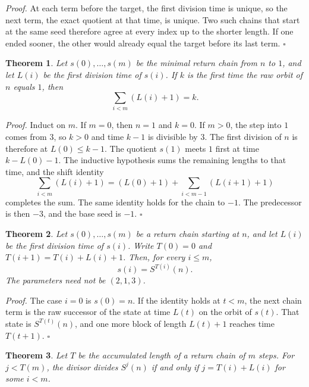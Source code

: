 \documentclass[11pt,letterpaper]{article}
\newtheorem{theorem}{Theorem}
\newenvironment{proof}{\noindent\textit{Proof.}}{\hfill\(\square\)}
\begin{document}
\begin{proof}
At each term before the target, the first division time is unique, so the next term, the exact quotient at that time, is unique. Two such chains that start at the same seed therefore agree at every index up to the shorter length. If one ended sooner, the other would already equal the target before its last term.
\end{proof}

\begin{theorem}
\label{thm:chainlength}
Let \(s(0),\ldots,s(m)\) be the minimal return chain from \(n\) to \(1\), and let \(L(i)\) be the first division time of \(s(i)\). If \(k\) is the first time the raw orbit of \(n\) equals \(1\), then
\[
\sum_{i<m}(L(i)+1)=k.
\]
\end{theorem}

\begin{proof}
Induct on \(m\). If \(m=0\), then \(n=1\) and \(k=0\). If \(m>0\), the step into \(1\) comes from \(3\), so \(k>0\) and time \(k-1\) is divisible by \(3\). The first division of \(n\) is therefore at \(L(0)\le k-1\). The quotient \(s(1)\) meets \(1\) first at time \(k-L(0)-1\). The inductive hypothesis sums the remaining lengths to that time, and the shift identity
\[
\sum_{i<m}(L(i)+1)=(L(0)+1)+\sum_{i<m-1}(L(i+1)+1)
\]
completes the sum. The same identity holds for the chain to \(-1\). The predecessor is then \(-3\), and the base seed is \(-1\).
\end{proof}

\begin{theorem}
\label{thm:chainorbit}
Let \(s(0),\ldots,s(m)\) be a return chain starting at \(n\), and let \(L(i)\) be the first division time of \(s(i)\). Write \(T(0)=0\) and \(T(i+1)=T(i)+L(i)+1\). Then, for every \(i\le m\),
\[
s(i)=S^{T(i)}(n).
\]
The parameters need not be \((2,1,3)\).
\end{theorem}

\begin{proof}
The case \(i=0\) is \(s(0)=n\). If the identity holds at \(t<m\), the next chain term is the raw successor of the state at time \(L(t)\) on the orbit of \(s(t)\). That state is \(S^{T(t)}(n)\), and one more block of length \(L(t)+1\) reaches time \(T(t+1)\).
\end{proof}

\begin{theorem}
\label{thm:divisiontimes}
Let \(T\) be the accumulated length of a return chain of \(m\) steps. For \(j<T(m)\), the divisor divides \(S^{j}(n)\) if and only if \(j=T(i)+L(i)\) for some \(i<m\).
\end{theorem}
\end{document}

